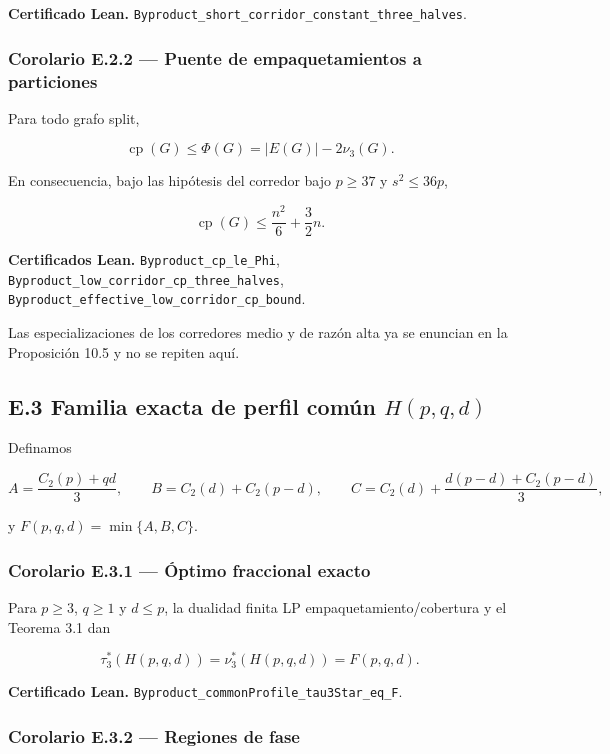 \documentclass[
  spanish,
  11pt,
  a4paper,
]{article}
\begin{document}
\textbf{Certificado Lean.} \texttt{Byproduct\_short\_corridor\_constant\_three\_halves}.

\subsubsection{Corolario E.2.2 --- Puente de empaquetamientos a particiones}\label{corolario-e.2.2-puente-de-empaquetamientos-a-particiones}

Para todo grafo split,

\[\operatorname{cp}(G)\le \Phi(G)=|E(G)|-2\nu_3(G).\]

En consecuencia, bajo las hipótesis del corredor bajo \(p\ge37\) y \(s^2\le36p\),

\[\operatorname{cp}(G)\le \frac{n^2}{6}+\frac32n.\]

\textbf{Certificados Lean.} \texttt{Byproduct\_cp\_le\_Phi}, \texttt{Byproduct\_low\_corridor\_cp\_three\_halves}, \texttt{Byproduct\_effective\_low\_corridor\_cp\_bound}.

Las especializaciones de los corredores medio y de razón alta ya se enuncian en la Proposición 10.5 y no se repiten aquí.

\subsection{\texorpdfstring{E.3 Familia exacta de perfil común \(H(p,q,d)\)}{E.3 Familia exacta de perfil común H(p,q,d)}}\label{e.3-familia-exacta-de-perfil-comuxfan-hpqd}

Definamos

\[A=\frac{C_2(p)+qd}{3},\qquad B=C_2(d)+C_2(p-d),\qquad C=C_2(d)+\frac{d(p-d)+C_2(p-d)}{3},\]

y \(F(p,q,d)=\min\{A,B,C\}\).

\subsubsection{Corolario E.3.1 --- Óptimo fraccional exacto}\label{corolario-e.3.1-uxf3ptimo-fraccional-exacto}

Para \(p\ge3\), \(q\ge1\) y \(d\le p\), la dualidad finita LP empaquetamiento/cobertura y el Teorema 3.1 dan

\[\tau_3^*(H(p,q,d))=\nu_3^*(H(p,q,d))=F(p,q,d).\]

\textbf{Certificado Lean.} \texttt{Byproduct\_commonProfile\_tau3Star\_eq\_F}.

\subsubsection{Corolario E.3.2 --- Regiones de fase}\label{corolario-e.3.2-regiones-de-fase}
\end{document}
